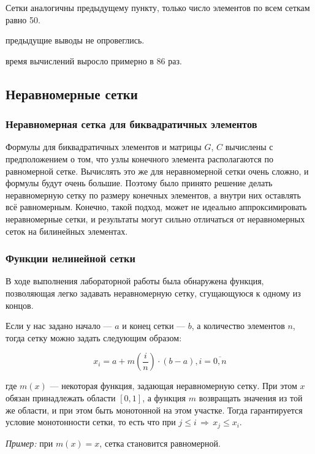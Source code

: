 Сетки аналогичны предыдущему пункту, только число элементов по всем сеткам равно 50.


\conclusion предыдущие выводы не опровеглись.

\conclusion время вычислений выросло примерно в 86 раз.

\subsection{Неравномерные сетки}

\subsubsection{Неравномерная сетка для биквадратичных элементов}

Формулы для биквадратичных элементов и матрицы $G$, $C$ вычислены с предположением о том, что узлы конечного элемента располагаются по равномерной сетке. Вычислять это же для неравномерной сетки очень сложно, и формулы будут очень большие. Поэтому было принято решение делать неравномерную сетку по размеру конечных элементов, а внутри них оставлять всё равномерным. Конечно, такой подход, может не идеально аппроксимировать неравномерные сетки, и результаты могут сильно отличаться от неравномерных сеток на билинейных элементах.

\subsubsection{Функции нелинейной сетки}

В ходе выполнения лабораторной работы была обнаружена функция, позволяющая легко задавать неравномерную сетку, сгущающуюся к одному из концов.

Если у нас задано начало --- $a$ и конец сетки --- $b$, а количество элементов $n$, тогда сетку можно задать следующим образом:

$$ x_i = a + m\left(\frac{i}{n}\right) \cdot (b-a), i=\overline{0, n} $$

где $m(x)$ --- некоторая функция, задающая неравномерную сетку. При этом $x$ обязан принадлежать области $[0, 1]$, а функция $m$ возвращать значения из той же области, и при этом быть монотонной на этом участке. Тогда гарантируется условие монотонности сетки, то есть что при $j \leqslant i\, \Rightarrow\, x_j \leqslant x_i$. 

\textit{Пример:} при $m(x) = x$, сетка становится равномерной.

